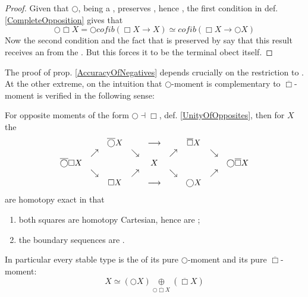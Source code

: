 \begin{proof}
Given that $\bigcirc$, being a , preserves , hence , the first condition in def. \ref{CompleteOpposition} gives that
\begin{displaymath}
\bigcirc \overline{\Box} X
=
\bigcirc cofib(\Box X \to X)
\simeq
cofib(\Box X \to \bigcirc X)
\end{displaymath}
Now the second condition and the fact that  is preserved by  say that this result receives an  from the . But this forces it to be the terminal obect itself.
\end{proof}
The proof of prop. \ref{AccuracyOfNegatives} depends crucially on the restriction to . At the other extreme, on  the intuition that $\bigcirc$-moment is complementary to $\overline{\Box}$-moment is verified in the following sense:
\begin{prop}
\label{TheHexagon}\hypertarget{TheHexagon}{}
For opposite moments of the form $\bigcirc \dashv \Box$, def. \ref{UnityOfOpposites}, then for  $X$ the 
\begin{displaymath}
\begin{matrix}
&& \overline{\bigcirc} X && \longrightarrow && \overline{\Box} X
\\
&\nearrow& &\searrow& & \nearrow && \searrow
\\
\overline{\bigcirc} \Box X && && X && && \bigcirc \overline{\Box} X
\\
&\searrow& &\nearrow & & \searrow && \nearrow
\\
&& \Box X && \longrightarrow && \bigcirc X
\end{matrix}
\end{displaymath}
are homotopy exact in that
\begin{enumerate}%
\item both squares are homotopy Cartesian, hence are ;
\item the boundary sequences are .
\end{enumerate}
In particular every stable type is the  of its pure $\bigcirc$-moment and its pure $\overline{\Box}$-moment:
\begin{displaymath}
X \simeq (\bigcirc X) \underset{\bigcirc \overline{\Box} X}{\oplus} (\overline{\Box} X)
\end{displaymath}
\end{prop}
